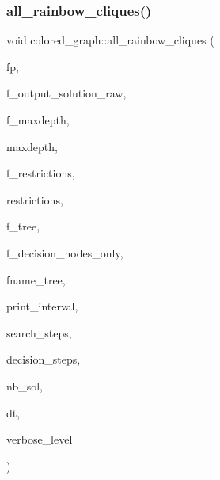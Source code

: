 \subsubsection{\texorpdfstring{all\+\_\+rainbow\+\_\+cliques()}{all\_rainbow\_cliques()}}
{\footnotesize\ttfamily void colored\+\_\+graph\+::all\+\_\+rainbow\+\_\+cliques (\begin{DoxyParamCaption}\item[{ofstream $\ast$}]{fp,  }\item[{\mbox{\hyperlink{galois_8h_a09fddde158a3a20bd2dcadb609de11dc}{I\+NT}}}]{f\+\_\+output\+\_\+solution\+\_\+raw,  }\item[{\mbox{\hyperlink{galois_8h_a09fddde158a3a20bd2dcadb609de11dc}{I\+NT}}}]{f\+\_\+maxdepth,  }\item[{\mbox{\hyperlink{galois_8h_a09fddde158a3a20bd2dcadb609de11dc}{I\+NT}}}]{maxdepth,  }\item[{\mbox{\hyperlink{galois_8h_a09fddde158a3a20bd2dcadb609de11dc}{I\+NT}}}]{f\+\_\+restrictions,  }\item[{\mbox{\hyperlink{galois_8h_a09fddde158a3a20bd2dcadb609de11dc}{I\+NT}} $\ast$}]{restrictions,  }\item[{\mbox{\hyperlink{galois_8h_a09fddde158a3a20bd2dcadb609de11dc}{I\+NT}}}]{f\+\_\+tree,  }\item[{\mbox{\hyperlink{galois_8h_a09fddde158a3a20bd2dcadb609de11dc}{I\+NT}}}]{f\+\_\+decision\+\_\+nodes\+\_\+only,  }\item[{const \mbox{\hyperlink{galois_8h_ab6cc7b4aeb6ea31aba2b3fbfc83ff5e6}{B\+Y\+TE}} $\ast$}]{fname\+\_\+tree,  }\item[{\mbox{\hyperlink{galois_8h_a09fddde158a3a20bd2dcadb609de11dc}{I\+NT}}}]{print\+\_\+interval,  }\item[{\mbox{\hyperlink{galois_8h_a09fddde158a3a20bd2dcadb609de11dc}{I\+NT}} \&}]{search\+\_\+steps,  }\item[{\mbox{\hyperlink{galois_8h_a09fddde158a3a20bd2dcadb609de11dc}{I\+NT}} \&}]{decision\+\_\+steps,  }\item[{\mbox{\hyperlink{galois_8h_a09fddde158a3a20bd2dcadb609de11dc}{I\+NT}} \&}]{nb\+\_\+sol,  }\item[{\mbox{\hyperlink{galois_8h_a09fddde158a3a20bd2dcadb609de11dc}{I\+NT}} \&}]{dt,  }\item[{\mbox{\hyperlink{galois_8h_a09fddde158a3a20bd2dcadb609de11dc}{I\+NT}}}]{verbose\+\_\+level }\end{DoxyParamCaption})}

\mbox{\label{classcolored__graph_adc7194b4555c9c5dbde203b4502fdbdf}} 
